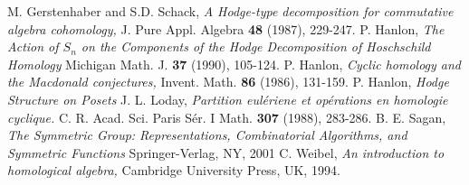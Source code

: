 \documentclass{amsart}
\begin{document}
\begin{thebibliography}{9}
  M. Gerstenhaber and S.D. Schack,
  \emph{A Hodge-type decomposition for commutative algebra cohomology,}
  J. Pure Appl. Algebra {\bf 48} (1987), 229-247.
  P. Hanlon, 
  \emph{The Action of $S_n$ on the Components of the Hodge Decomposition of Hoschschild Homology}
  Michigan Math. J. {\bf 37} (1990), 105-124.
  P. Hanlon,
  \emph{Cyclic homology and the Macdonald conjectures,}
  Invent. Math. {\bf 86} (1986), 131-159.
  P. Hanlon,
  \emph{Hodge Structure on Posets}
  J. L. Loday,
  \emph{Partition eul\'eriene et op\'erations en homologie cyclique.}
  C. R. Acad. Sci. Paris S\'er. I Math. {\bf 307} (1988), 283-286.
  B. E. Sagan,
  \emph{The Symmetric Group: Representations, Combinatorial Algorithms, and Symmetric Functions}
  Springer-Verlag, NY, 2001
  C. Weibel,
  \emph{An introduction to homological algebra,}
  Cambridge University Press, UK, 1994.

\end{thebibliography}
\end{document}
